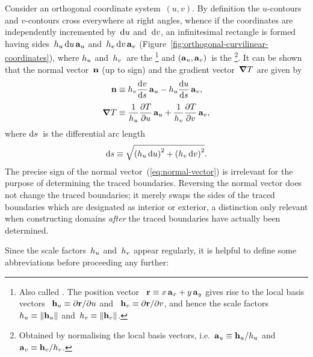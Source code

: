 Consider an orthogonal coordinate system~$(u, v)$.
By definition the $u$-contours and $v$-contours
cross everywhere at right angles,
whence if the coordinates are independently incremented
by~$\mathop{}\!\mathrm{d} u$ and~$\mathop{}\!\mathrm{d} v$,
an infinitesimal rectangle is formed
having sides~$\scalefac[u] \td u \basisvec{u}$
and~$\scalefac[v] \td v \basisvec{v}$
(Figure~\ref{fig:orthogonal-curvilinear-coordinates}),
where $\scalefac[u]$ and~$\scalefac[v]$~are the %
\footnote{
  Also called .
  The position vector~%
    $\boldsymbol{\mathbf{r}} \equiv x \mathop{}\!\boldsymbol{\mathbf{a}}_{x} + y \mathop{}\!\boldsymbol{\mathbf{a}}_{y}$
  gives rise to the local basis vectors~%
    $\mathop{}\!\boldsymbol{\mathbf{h}}_{u} \equiv \mathop{}\!\partial\boldsymbol{\mathbf{r}} / {\mathop{}\!\partial u}$
  and~%
    $\mathop{}\!\boldsymbol{\mathbf{h}}_{v} \equiv \mathop{}\!\partial\boldsymbol{\mathbf{r}} / {\mathop{}\!\partial v}$,
  and hence the scale factors~$\scalefac[u] \ideq \norm{\localvec{u}}$
  and~$\scalefac[v] \ideq \norm{\localvec{v}}$.
}
and $(\mathop{}\!\boldsymbol{\mathbf{a}}_{u}, \mathop{}\!\boldsymbol{\mathbf{a}}_{v})$~is the %
\footnote{
  Obtained by normalising the local basis vectors,
  i.e.~$\basisvec{u} \ideq \localvec{u} / \scalefac[u]$
  and~$\basisvec{v} \ideq \localvec{v} / \scalefac[v]$.
}.
It can be shown that the normal vector~$\mathop{}\!\boldsymbol{\mathbf{n}}$ (up to sign)
and the gradient vector~$\mathop{}\!\boldsymbol{\mathbf{\nabla}} T$ are given by
\begin{align}
  \normalvec &\ideq
    \scalefac[v] \tder{v}{s} \basisvec{u}
      -
    \scalefac[u] \tder{u}{s} \basisvec{v},
    \label{eq:normal-vector}
    \\[\tallspace]
  \del T &\ideq
    \frac{1}{\scalefac[u]} \pder{T}{u} \basisvec{u}
      +
    \frac{1}{\scalefac[v]} \pder{T}{v} \basisvec{v},
    \label{eq:gradient}
\end{align}
where $\mathop{}\!\mathrm{d} s$~is the differential arc length
\begin{equation}
  \td s \ideq
  \sqrt{
    \roundbr[\bulkysize]{\scalefac[u] \td u}^2
      +
    \roundbr[\bulkysize]{\scalefac[v] \td v}^2
  }.
  \label{eq:differential-arc-length}
\end{equation}
The precise sign of the normal vector~(\ref{eq:normal-vector}) is irrelevant
for the purpose of determining the traced boundaries.
Reversing the normal vector does not change the traced boundaries;
it merely swaps the sides of the traced boundaries
which are designated as interior or exterior,
a distinction only relevant when constructing domains
\emph{after} the traced boundaries have actually been determined.

Since the scale factors~$\scalefac[u]$ and~$\scalefac[v]$ appear regularly,
it is helpful to define some abbreviations
before proceeding any further:


